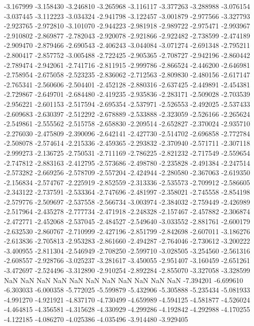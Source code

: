 -3.167999
-3.158430
-3.246810
-3.265968
-3.116117
-3.377263
-3.288988
-3.076154
-3.037445
-3.112223
-3.034324
-2.941798
-3.122457
-3.001879
-2.977566
-3.327793
-2.923765
-2.972810
-3.101070
-2.944223
-2.981918
-2.989722
-2.975471
-2.993967
-2.910802
-2.869877
-2.782043
-2.920078
-2.921866
-2.922482
-2.738599
-2.474189
-2.909470
-2.879466
-2.690543
-2.406243
-3.044084
-3.071274
-2.691348
-2.795211
-2.800417
-2.857752
-3.005488
-2.722425
-2.905365
-2.708727
-2.942196
-2.860442
-2.789474
-2.942061
-2.741716
-2.811915
-2.999786
-2.866524
-2.446200
-2.646981
-2.758954
-2.675058
-2.523235
-2.836062
-2.712563
-2.809830
-2.480156
-2.617147
-2.765341
-2.560606
-2.504401
-2.452128
-2.880316
-2.637425
-2.449891
-2.454381
-2.729867
-2.649701
-2.684480
-2.419235
-2.935836
-2.283171
-2.509028
-2.703539
-2.956221
-2.601153
-2.517594
-2.695354
-2.537971
-2.526553
-2.492025
-2.537433
-2.609683
-2.630397
-2.512292
-2.678889
-2.533888
-2.323059
-2.526166
-2.265624
-2.549861
-2.555562
-2.515758
-2.658830
-2.209514
-2.652827
-2.370024
-2.935710
-2.276030
-2.475809
-2.390096
-2.642141
-2.427730
-2.514702
-2.696858
-2.772784
-2.508078
-2.574614
-2.215336
-2.459365
-2.293832
-2.370940
-2.571711
-2.307118
-2.999273
-2.136725
-2.750531
-2.711169
-2.786225
-2.821232
-2.717549
-2.559654
-2.747812
-2.883163
-2.412795
-2.573686
-2.498780
-2.235828
-2.491384
-2.247514
-2.573282
-2.669256
-2.578709
-2.557204
-2.424944
-2.280580
-2.367063
-2.619350
-2.156834
-2.574767
-2.225919
-2.852559
-2.313336
-2.535573
-2.709912
-2.586605
-2.343122
-2.737591
-2.533364
-2.747696
-2.481997
-2.358021
-2.745558
-2.854198
-2.579776
-2.509697
-2.537558
-2.566734
-3.003974
-2.384032
-2.759449
-2.426989
-2.517964
-2.435278
-2.777734
-2.471918
-2.248328
-2.157467
-2.457882
-2.306874
-2.472771
-2.452068
-2.537045
-2.484527
-2.549640
-3.033552
-2.881761
-2.600179
-2.632530
-2.860767
-2.710999
-2.427196
-2.851799
-2.842698
-2.607011
-3.186276
-2.613836
-2.705813
-2.953283
-2.861660
-2.494287
-2.764046
-2.730612
-3.200222
-3.400955
-2.811304
-2.546949
-2.708250
-2.599710
-3.028505
-3.254560
-2.561316
-2.608557
-2.928766
-3.025237
-3.281617
-3.450055
-2.951407
-3.160459
-2.651261
-3.472697
-2.524496
-3.312890
-2.910254
-2.892284
-2.855070
-3.327058
-3.328599
NaN
NaN
NaN
NaN
NaN
NaN
NaN
NaN
NaN
NaN
NaN
-7.394201
-6.699610
-6.303033
-6.000358
-5.772025
-5.599879
-5.432906
-5.305888
-5.235434
-5.081933
-4.991270
-4.921921
-4.837170
-4.730499
-4.659989
-4.594125
-4.581877
-4.526024
-4.464815
-4.356581
-4.315628
-4.330929
-4.299286
-4.192842
-4.292988
-4.170255
-4.122185
-4.086270
-4.025386
-4.035496
-3.914480
-3.929405
